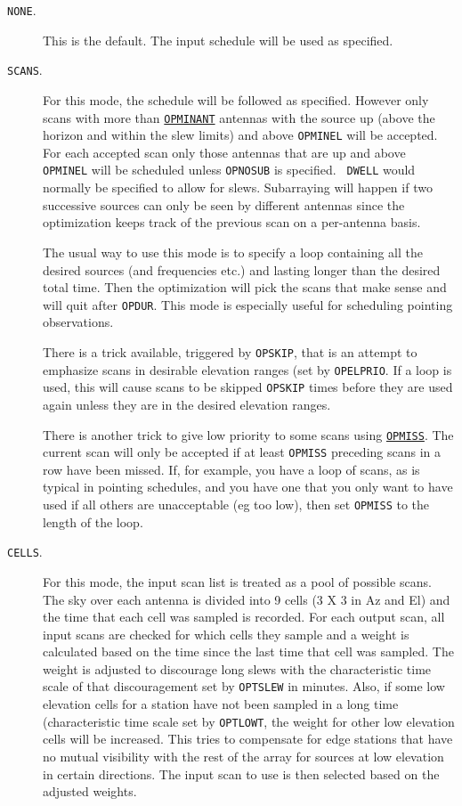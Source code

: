 \documentclass{report}
\begin{document}
\begin{description}

\item[{\tt NONE}.]  This is the default.  The input schedule will
be used as specified.

\item[{\tt SCANS}.]  For this mode, the schedule will be followed as
specified.  However only scans with more than 
{\hyperref[MP:OPMINANT]{{\tt OPMINANT}}}
antennas with the source up (above the horizon
and within the slew limits) and above {\tt OPMINEL} will be accepted.
For each accepted scan only those antennas that are up and above {\tt
OPMINEL} will be scheduled unless {\tt OPNOSUB} is specified.  {\tt
DWELL} would normally be specified to allow for slews.  Subarraying
will happen if two successive sources can only be seen by different
antennas since the optimization keeps track of the previous scan on a
per-antenna basis.

The usual way to use this mode is to specify a loop containing all
the desired sources (and frequencies etc.) and lasting longer than
the desired total time.  Then the optimization will pick the scans
that make sense and will quit after {\tt OPDUR}.  This mode is
especially useful for scheduling pointing observations.

There is a trick available, triggered by {\tt OPSKIP}, that is an
attempt to emphasize scans in desirable elevation ranges (set by
{\tt OPELPRIO}.  If a loop is used, this will cause scans to be
skipped {\tt OPSKIP} times before they are used again unless they
are in the desired elevation ranges.

There is another trick to give low priority to some scans using
{\hyperref[MP:OPMISS]{{\tt OPMISS}}}.  The current scan will only
be accepted if at least {\tt OPMISS} preceding scans in a row
have been missed.  If, for example, you have a loop of scans,
as is typical in pointing schedules, and you have one that you
only want to have used if all others are unacceptable (eg too low),
then set {\tt OPMISS} to the length of the loop.

\item[{\tt CELLS}.]  For this mode, the input scan list is treated
as a pool of possible scans.  The sky over each antenna is divided
into 9 cells (3 X 3 in Az and El) and the time that each cell
was sampled is recorded.  For each output scan, all input scans
are checked for which cells they sample and a weight is calculated
based on the time since the last time that cell was sampled.  The
weight is adjusted to discourage long slews with the characteristic
time scale of that discouragement set by {\tt OPTSLEW} in minutes.
Also, if some low elevation cells for a station have not been
sampled in a long time (characteristic time scale set by {\tt OPTLOWT},
the weight for other low elevation cells will be increased.  This
tries to compensate for edge stations that have no mutual visibility
with the rest of the array for sources at low elevation in certain
directions.  The input scan to use is then selected based on the
adjusted weights.


\end{description}
\end{document}
